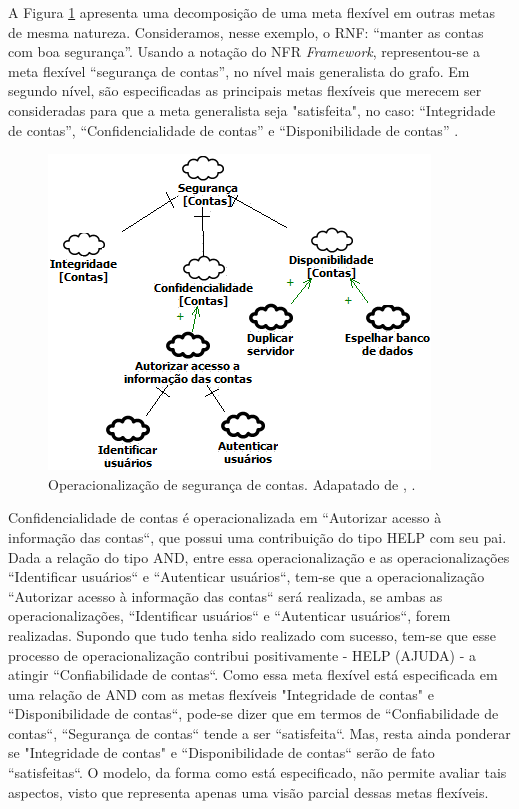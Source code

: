 \pagebreak

A Figura \ref{exemploNFR} apresenta uma decomposição de uma meta flexível em outras metas de mesma natureza. Consideramos, nesse exemplo, o RNF: “manter as contas com boa segurança”. Usando a notação do NFR \textit{Framework}, representou-se a meta flexível  “segurança de contas”, no nível mais generalista do grafo. Em segundo nível, são especificadas as principais metas flexíveis que merecem ser consideradas para que a meta generalista seja "satisfeita", no caso: “Integridade de contas”, “Confidencialidade de contas” e “Disponibilidade de contas” \cite{chung2012non}.

\begin{figure}[h!]
	\centering
	\includegraphics[keepaspectratio=true,scale=1.0]{figuras/exemploNFR.png}
	\caption{Operacionalização de segurança de contas. Adapatado de \cite{chung2012non}, \cite{affleck2012supporting}.}
	\label{exemploNFR}
\end{figure} 

Confidencialidade de contas é operacionalizada em ``Autorizar acesso à informação das contas``, que possui uma contribuição do tipo HELP com seu pai. Dada a relação do tipo AND, entre essa operacionalização e as operacionalizações ``Identificar usuários`` e ``Autenticar usuários``, tem-se que a operacionalização ``Autorizar acesso à informação das contas``  será realizada, se ambas as operacionalizações, ``Identificar usuários`` e ``Autenticar usuários``, forem realizadas. Supondo que tudo tenha sido realizado com sucesso, tem-se que esse processo de operacionalização contribui positivamente - HELP (AJUDA) - a atingir ``Confiabilidade de contas``. Como essa meta flexível está especificada em uma relação de AND com as metas flexíveis "Integridade de contas" e ``Disponibilidade de contas``, pode-se dizer que em termos de ``Confiabilidade de contas``, ``Segurança de contas`` tende a ser ``satisfeita``. Mas, resta ainda ponderar se "Integridade de contas" e ``Disponibilidade de contas`` serão de fato ``satisfeitas``. O modelo, da forma como está especificado, não permite avaliar tais aspectos, visto que representa apenas uma visão parcial dessas metas flexíveis.


